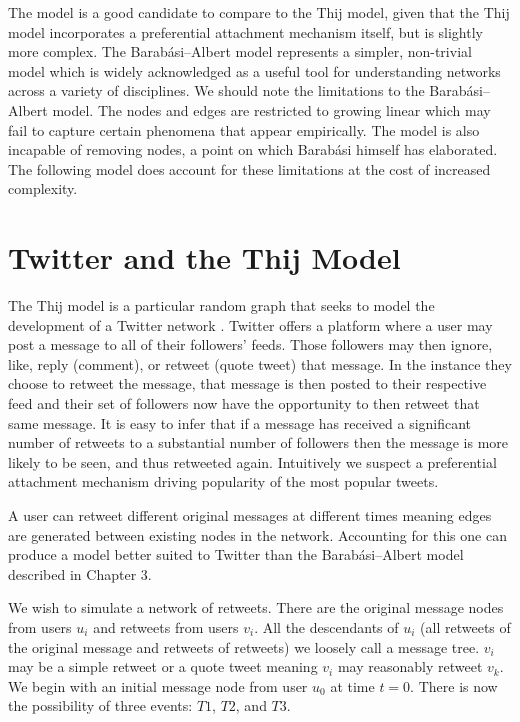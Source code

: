 The model is a good candidate to compare to the Thij model, given that the Thij model incorporates
a preferential attachment mechanism itself, but is slightly more complex. The Barabási–Albert model 
represents a simpler, non-trivial model which is widely acknowledged as a useful tool
for understanding networks across a variety of disciplines. We should note the 
limitations to the Barabási–Albert model. The nodes and edges are restricted to growing linear which
may fail to capture certain phenomena that appear empirically. The model is also incapable
 of removing nodes, a point on which Barabási himself has elaborated. The following model
 does account for these limitations at the cost of increased complexity.

\chapter{Twitter and the Thij Model}
\label{section:Thij model}
The Thij model is a particular random graph that seeks to model the development of a Twitter network 
 \cite{thij}. Twitter offers a platform where a user may post a message
to all of their followers' feeds. Those followers may then ignore, like, reply (comment), or retweet (quote tweet) that message. In the
instance they choose to retweet the message, that message is then posted to their respective feed and their
set of followers now have the opportunity to then retweet that same message. It is easy to infer that if a 
message has received a significant number of retweets to a substantial number of followers
 then the message is more likely to be seen, and thus
retweeted again. Intuitively we suspect a preferential attachment mechanism driving popularity of the most popular tweets.

A user can retweet different original messages at different times meaning edges are generated between
existing nodes in the network. Accounting for this one can produce
a model better suited to Twitter than the Barabási–Albert model described in Chapter 3.

We wish to simulate a network of retweets. There are the original message nodes from users $u_i$ and retweets from users $v_i$. All the descendants of $u_i$ (all retweets of the original message and retweets of retweets)
we loosely call a message tree. $v_i$ may be a simple retweet or a quote tweet meaning 
$v_i$ may reasonably retweet $v_k$.
 We begin with an initial message node from user $u_{0}$ at time $t=0$. There is now the possibility of three events: $T1$,
$T2$, and $T3$.

